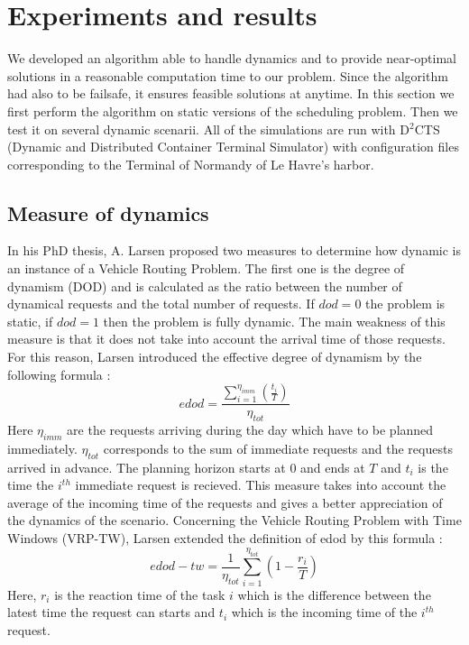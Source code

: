 \documentclass[a4paper,10pt]{article}
\begin{document}
\section{Experiments and results}
   We developed an algorithm able to handle dynamics and to provide near-optimal solutions in a reasonable computation time to our problem. Since the algorithm had also to be failsafe, it ensures feasible solutions at anytime. In this section we first perform the algorithm on static versions of the scheduling problem. Then we test it on several dynamic scenarii.
   All of the simulations are run with D$^2$CTS (Dynamic and Distributed Container Terminal Simulator)\cite{Lesauvage2011} with configuration files corresponding to the Terminal of Normandy of Le Havre's harbor.
	\subsection{Measure of dynamics}
In his PhD thesis\cite{Larsen00}, A. Larsen proposed two measures to determine how dynamic is an instance of a Vehicle Routing Problem. The first one is the degree of dynamism (DOD) and is calculated as the ratio between the number of dynamical requests and the total number of requests. If $dod=0$ the problem is static, if $dod=1$ then the problem is fully dynamic. The main weakness of this measure is that it does not take into account the arrival time of those requests. For this reason, Larsen introduced the effective degree of dynamism by the following formula : 
\begin{equation*}
 edod = \frac{\sum_{i=1}^{\eta_{imm}}\left(\frac{t_i}{T}\right)}{\eta_{tot}}
\end{equation*}
Here $\eta_{imm}$ are the requests arriving during the day which have to be planned immediately. $\eta_{tot}$ corresponds to the sum of immediate requests and the requests arrived in advance. The planning horizon starts at $0$ and ends at $T$ and $t_i$ is the time the $i^{th}$ immediate request is recieved. This measure takes into account the average of the incoming time of the requests and gives a better appreciation of the dynamics of the scenario.
Concerning the Vehicle Routing Problem with Time Windows (VRP-TW), Larsen extended the definition of edod by this formula : 
\begin{equation*}
 edod-tw = \frac{1}{\eta_{tot}} \sum_{i=1}^{\eta_{tot}} \left(1 - \frac{r_i}{T}\right)
\end{equation*}
Here, $r_i$ is the reaction time of the task $i$ which is the difference between the latest time the request can starts and $t_i$ which is the incoming time of the $i^{th}$ request.
\end{document}
